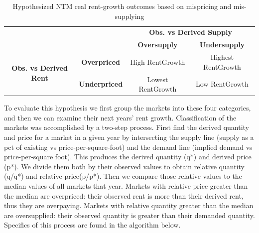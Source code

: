\documentclass[sn-mathphys-num]{sn-jnl}%
\theoremstyle{thmstyleone}%
\theoremstyle{thmstyletwo}%
\theoremstyle{thmstylethree}%
\begin{document}
\begin{table}[h!]
\centering
\begin{tabular}{cc|c|c|}
\multicolumn{2}{c}{} & \multicolumn{2}{c}{\textbf{Obs. vs Derived Supply}} \\
\multicolumn{2}{c}{} & \textbf{Oversupply} & \textbf{Undersupply} \\
\cmidrule{3-4}
\multirow{2}{*}{\textbf{Obs. vs Derived Rent}} & \textbf{Overpriced} & High RentGrowth & Highest RentGrowth \\\cmidrule{2-4}
 & \textbf{Underpriced} & Lowest RentGrowth & Low RentGrowth \\
\bottomrule
\end{tabular}
\caption{Hypothesized NTM real rent-growth outcomes based on mispricing and mis-supplying}
\end{table}

To evaluate this hypothesis we first group the markets into these four categories, and then we can examine their next years' rent growth.
Classification of the markets was accomplished by a two-step process. First find the derived quantity and price for a market in a given year by intersecting the supply line (supply as a pct of existing vs price-per-square-foot) and the demand line (implied demand vs price-per-square foot). This produces the derived quantity (q*) and derived price (p*). We divide them both by their observed values to obtain relative quantity (q/q*) and relative price(p/p*). Then we compare those relative values to the median values of all markets that year. 
Markets with relative price greater than the median are overpriced: their observed rent is more than their derived rent, thus they are overpaying. Markets with relative quantity greater than the median are oversupplied: their observed quantity is greater than their demanded quantity. Specifics of this process are found in the algorithm below. 
\end{document}
